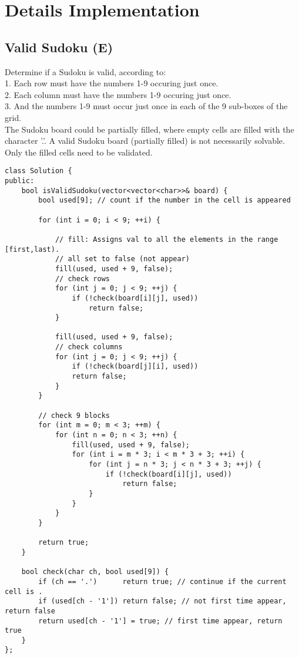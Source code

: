 \chapter{Details Implementation}
\section{Valid Sudoku (E)}
Determine if a Sudoku is valid, according to:\\
1. Each row must have the numbers 1-9 occuring just once. \\
2. Each column must have the numbers 1-9 occuring just once. \\
3. And the numbers 1-9 must occur just once in each of the 9 sub-boxes of the grid. \\

The Sudoku board could be partially filled, where empty cells are filled with the character '.'.  A valid Sudoku board (partially filled) is not necessarily solvable. Only the filled cells need to be validated. \\

\begin{lstlisting}
class Solution {
public:
    bool isValidSudoku(vector<vector<char>>& board) {
        bool used[9]; // count if the number in the cell is appeared

        for (int i = 0; i < 9; ++i) {

            // fill: Assigns val to all the elements in the range [first,last).
            // all set to false (not appear)
            fill(used, used + 9, false);
            // check rows
            for (int j = 0; j < 9; ++j) { 
                if (!check(board[i][j], used))
                    return false;
            }

            fill(used, used + 9, false);
            // check columns
            for (int j = 0; j < 9; ++j) {               
                if (!check(board[j][i], used))
                return false;
            }
        }
        
        // check 9 blocks
        for (int m = 0; m < 3; ++m) {                   
            for (int n = 0; n < 3; ++n) {
                fill(used, used + 9, false);
                for (int i = m * 3; i < m * 3 + 3; ++i) {
                    for (int j = n * 3; j < n * 3 + 3; ++j) {
                        if (!check(board[i][j], used))
                            return false;
                    }
                }
            }
        }
        
        return true;
    }
    
    bool check(char ch, bool used[9]) {
        if (ch == '.')      return true; // continue if the current cell is .
        if (used[ch - '1']) return false; // not first time appear, return false
        return used[ch - '1'] = true; // first time appear, return true
    }
};
\end{lstlisting}


